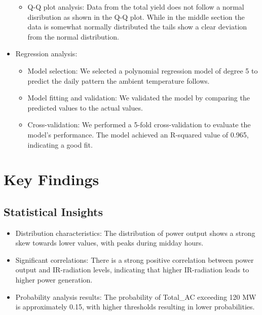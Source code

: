 \documentclass[10pt]{article}
\begin{document}
\begin{itemize}
    \begin{itemize}
        \item Q-Q plot analysis: Data from the total yield does not follow a normal disribution as shown in the Q-Q plot. While in the middle section the data is somewhat normally distributed the tails show a clear deviation from the normal distribution.
    \end{itemize}
    \item Regression analysis:
    \begin{itemize}
        \item Model selection: We selected a polynomial regression model of degree 5 to predict the daily pattern the ambient temperature follows.
        \item Model fitting and validation: We validated the model by comparing the predicted values to the actual values.
        \item Cross-validation: We performed a 5-fold cross-validation to evaluate the model's performance. The model achieved an R-squared value of 0.965, indicating a good fit.
    \end{itemize}
\end{itemize}

\section{Key Findings}

\subsection{Statistical Insights}
\begin{itemize}
    \item Distribution characteristics: The distribution of power output shows a strong skew towards lower values, with peaks during midday hours.
    \item Significant correlations: There is a strong positive correlation between power output and IR-radiation levels, indicating that higher IR-radiation leads to higher power generation.
    \item Probability analysis results: The probability of Total\_AC exceeding 120 MW is approximately 0.15, with higher thresholds resulting in lower probabilities.
\end{itemize}
\end{document}
